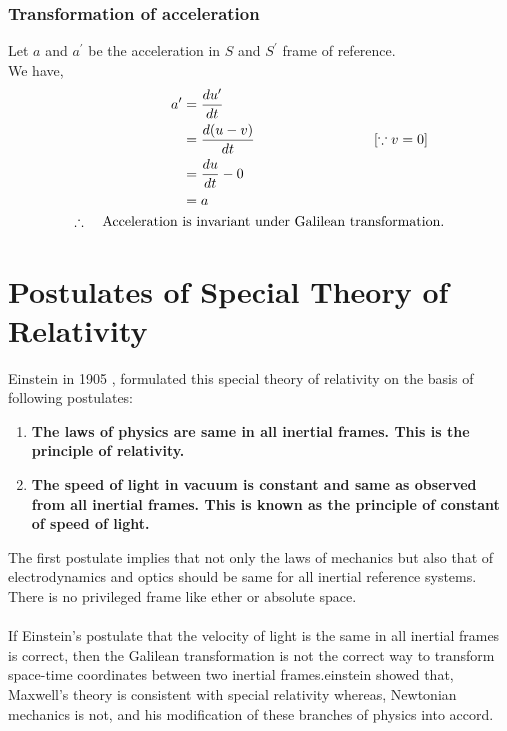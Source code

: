 \subsubsection{Transformation of acceleration}
Let $ a $ and  ${a}^{\prime}$  be the acceleration in ${S}$ and ${S}^{\prime}$ frame of reference.\\
We have, 
\begin{align*}
a^{\prime}&=\frac{d u^{\prime}}{d t}\\&=\frac{d(u-v)}{d t}\hspace{3cm} [\because v=0]\\&=\frac{d u}{d t}-0\\&=a\\
\text{$\therefore$ \quad
	Acceleration }&\text{is invariant under Galilean transformation.}
\end{align*}
\section{Postulates of Special Theory of Relativity}
Einstein in 1905 , formulated this special theory of relativity on the basis of following postulates:
\begin{enumerate}
	\item \textbf{The laws of physics are same in all inertial frames. This is the principle of relativity.}
	\item \textbf{The speed of light in vacuum is constant and same as observed from all inertial frames. This is known as the principle of constant of speed of light.}
\end{enumerate}

The first postulate implies that not only the laws of mechanics but also that of electrodynamics and optics should be same for all inertial reference systems. There is no privileged frame like ether or absolute space.\\\\
 If Einstein's postulate that the velocity of light is the same in all inertial frames  is correct, then the Galilean transformation is not the correct way to transform space-time coordinates between two inertial frames.einstein showed that, Maxwell's theory is consistent with special relativity whereas, Newtonian mechanics is not, and his modification of these branches of physics into accord.
